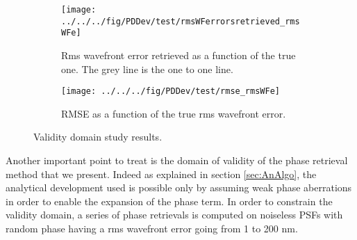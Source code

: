\begin{figure}
\centering
    \begin{subfigure}{0.45\textwidth}
        \texttt{[image: ../../../fig/PDDev/test/rmsWFerrorsretrieved\_rmsWFe]}
        \caption{Rms wavefront error retrieved as a function of the true one. The grey line is the one to one line.}
        \label{subfig:rmsWFerrorsretrieved_rmsWFe}
    \end{subfigure}
    \quad
    \begin{subfigure}{0.45\textwidth}
        \texttt{[image: ../../../fig/PDDev/test/rmse\_rmsWFe]}
        \caption{RMSE as a function of the true rms wavefront error.}
        \label{subfig:rmse_rmsWFe}
    \end{subfigure}
    \decoRule
    \caption{Validity domain study results.}
\end{figure}

Another important point to treat is the domain of validity of the phase retrieval method that we present. Indeed as explained in section \ref{sec:AnAlgo}, the analytical development used is possible only by assuming weak phase aberrations in order to enable the expansion of the phase term. In order to constrain the validity domain, a series of phase retrievals is computed on noiseless PSFs with random phase having a rms wavefront error going from 1 to 200 nm. 